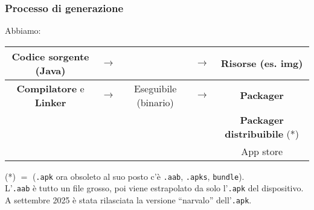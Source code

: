 \subsubsection{Processo di generazione}
\par Abbiamo: 
\begin{center}
    \begin{tabular}{ |c c c c c| }
        \hline
        \textbf{Codice sorgente} (Java) & $\rightarrow$ & & $\rightarrow$ & Risorse (es. img) \\
        \hline
        \textbf{Compilatore} e \textbf{Linker} & $\rightarrow$ & Eseguibile (binario) & $\rightarrow$ & \textbf{Packager} \\
        \hline
        & & & & \textbf{Packager distribuibile} (*) \\
        \hline
        & & & & App store\\
        \hline
    \end{tabular}
\end{center}
(*) $=$ (\texttt{.apk} ora obsoleto al suo posto c'è \texttt{.aab}, \texttt{.apks}, \texttt{bundle}).\\
L'\texttt{.aab} è tutto un file grosso, poi viene estrapolato da solo l'\texttt{.apk} del dispositivo.\\
A settembre 2025 è stata rilasciata la versione ``narvalo'' dell'\texttt{.apk}.

